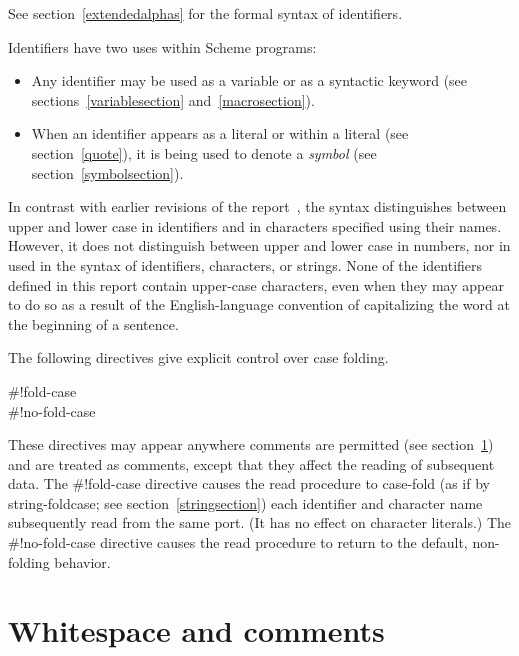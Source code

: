 See section~\ref{extendedalphas} for the formal syntax of identifiers.

\vest Identifiers have two uses within Scheme programs:
\begin{itemize}
\item Any identifier may be used as a variable
 or as a syntactic keyword
(see sections~\ref{variablesection} and~\ref{macrosection}).

\item When an identifier appears as a literal or within a literal
(see section~\ref{quote}), it is being used to denote a {\em symbol}
(see section~\ref{symbolsection}).
\end{itemize}

In contrast with earlier revisions of the report~\cite{R5RS}, the
syntax distinguishes between upper and lower case in
identifiers and in characters specified using their names.  However, it
does not distinguish between upper and lower case in numbers,
nor in  used
in the syntax of identifiers, characters, or strings.
None of the identifiers defined in this report contain upper-case
characters, even when they may appear to do so as a result
of the English-language convention of capitalizing the word at
the beginning of a sentence.

The following directives give explicit control over case
folding.

\begin{entry}{%
{\cf{}\#!fold-case}\\
{\cf{}\#!no-fold-case}}

These directives may appear anywhere comments are permitted (see
section~\ref{wscommentsection})
and are treated as comments, except that they affect the reading
of subsequent data. The {\cf{}\#!fold-case} directive causes
the {\cf read} procedure to case-fold (as if by {\cf string-foldcase};
see section~\ref{stringsection}) each identifier and character name
subsequently read from the same port.  (It has no effect on character
literals.)  The {\cf{}\#!no-fold-case} directive
causes the {\cf read} procedure to return to the default, non-folding behavior.
\end{entry}



\section{Whitespace and comments}
\label{wscommentsection}

